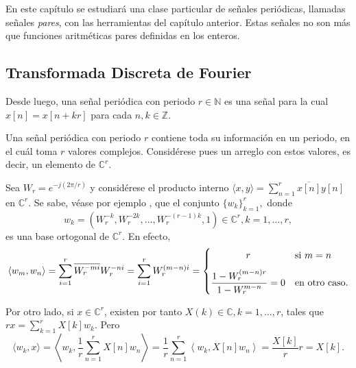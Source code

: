 En este capítulo se estudiará una clase particular de señales periódicas, llamadas señales \emph{pares}, con las herramientas del capítulo anterior. Estas señales no son más que funciones aritméticas pares definidas en los enteros.

\subsection{Transformada Discreta de Fourier}

\begin{definition}
Desde luego, una señal periódica con periodo $r \in \mathbb{N}$ es una señal para la cual $x[n] = x[n + k r]$ para cada $n,k \in \mathbb{Z}$.
\end{definition}

Una señal periódica con periodo $r$ contiene toda su información en un periodo, en el cuál toma $r$ valores complejos. Considérese pues un arreglo con estos valores, es decir, un elemento de $\mathbb{C}^r$.
\bigskip

Sea $W_r = e^{-j(2 \pi / r)}$ y considérese el producto interno $\langle x,y \rangle = \sum_{n=1}^{r} \overline{x[n]} y[n]$ en $\mathbb{C}^r$. Se sabe, véase por ejemplo \cite{Prand1}, que el conjunto $\{ w_k \}_{k=1}^r,$ donde \begin{equation*}
    w_k = (W_r^{-k}, W_r^{-2 k}, \ldots, W_r^{-(r-1) k}, 1) \in \mathbb{C}^r, k=1,\ldots,r,
\end{equation*}
es una base ortogonal de $\mathbb{C}^r$. En efecto,
\begin{equation*}
    \langle w_m, w_n \rangle = \sum_{i=1}^{r} \overline{W_r^{-m i}} W_r^{-n i} = \sum_{i=1}^{r} W_r^{(m-n)i} = \begin{cases}
        \hfil r & \text{si } m=n \\[7pt]
        \hfil \displaystyle\frac{1-W_r^{(m-n)r}}{1-W_r^{m-n}} = 0 & \text{en otro caso}.
    \end{cases}
\end{equation*}

Por otro lado, si $x \in \mathbb{C}^r$, existen por tanto $X(k) \in \mathbb{C}, k=1,\ldots,r$, tales que $r x = \sum_{k=1}^{r} X[k] w_k$. Pero
\begin{equation*}
    \langle w_k, x \rangle = \left\langle w_k, \frac{1}{r} \sum_{n=1}^{r} X[n] w_n \right\rangle = \frac{1}{r} \sum_{n=1}^{r} \left\langle w_k, X[n] w_n \right\rangle = \frac{X[k]}{r} r = X[k].
\end{equation*}

